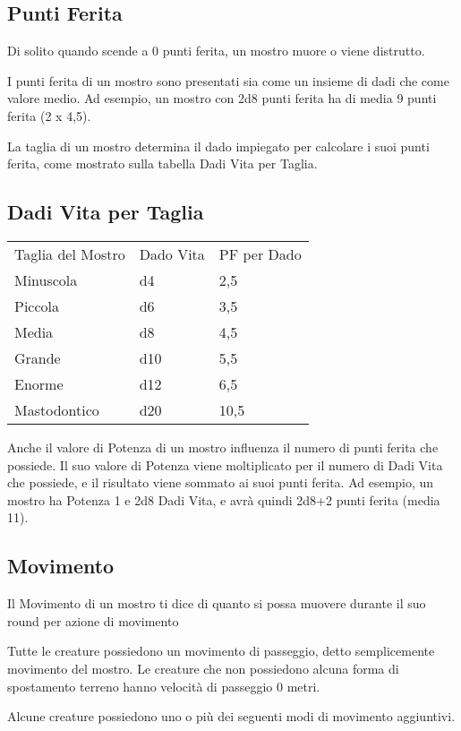 \subsection{Punti Ferita}

Di solito quando scende a 0 punti ferita, un mostro muore o viene
distrutto.

I punti ferita di un mostro sono presentati sia come un insieme di dadi
che come valore medio. Ad esempio, un mostro con 2d8 punti ferita ha di
media 9 punti ferita (2 x 4,5).

La taglia di un mostro determina il dado impiegato per calcolare i suoi
punti ferita, come mostrato sulla tabella Dadi Vita per Taglia.

\subsection{Dadi Vita per Taglia}

\medskip
\begin{tabular}{lll}
\toprule
Taglia del Mostro & Dado Vita & PF per Dado\\
Minuscola &d4&2,5\\
Piccola &d6&3,5\\
Media&d8 &4,5\\
Grande&d10&5,5\\
Enorme&d12&6,5\\
Mastodontico&d20&10,5\\
\end{tabular}
\medskip

Anche il valore di Potenza di un mostro influenza il numero di punti ferita che possiede. Il suo valore di Potenza viene moltiplicato per il numero di Dadi Vita che possiede, e il risultato viene sommato ai suoi punti ferita. Ad esempio, un mostro ha Potenza 1 e 2d8 Dadi Vita, e avrà quindi 2d8+2 punti ferita (media 11).

\subsection{Movimento}

Il Movimento di un mostro ti dice di quanto si possa muovere durante il suo round per azione di movimento

Tutte le creature possiedono un movimento di passeggio, detto semplicemente movimento del mostro. Le creature che non possiedono alcuna forma di spostamento terreno hanno velocità di passeggio 0 metri.

Alcune creature possiedono uno o più dei seguenti modi di movimento aggiuntivi.

